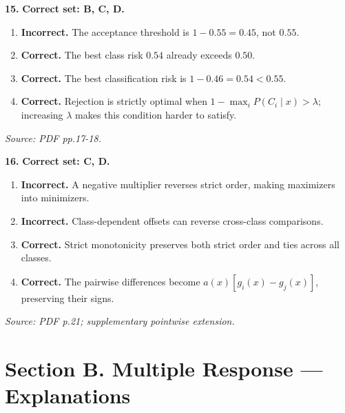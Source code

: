 \documentclass[11pt,a4paper]{article}
\begin{document}
\par\noindent\begin{minipage}{\linewidth}
\textbf{15.} \textbf{Correct set: B, C, D.}
\begin{enumerate}[label=(\Alph*),leftmargin=8mm,itemsep=2pt,topsep=2pt]
\item \textbf{Incorrect.} The acceptance threshold is \(1-0.55=0.45\), not \(0.55\).
\item \textbf{Correct.} The best class risk \(0.54\) already exceeds \(0.50\).
\item \textbf{Correct.} The best classification risk is \(1-0.46=0.54<0.55\).
\item \textbf{Correct.} Rejection is strictly optimal when \(1-\max_iP(C_i\mid x)>\lambda\); increasing \(\lambda\) makes this condition harder to satisfy.
\end{enumerate}
{\footnotesize\textit{Source: PDF pp.17-18.}}

\end{minipage}\par\vspace{3mm}
\par\noindent\begin{minipage}{\linewidth}
\textbf{16.} \textbf{Correct set: C, D.}
\begin{enumerate}[label=(\Alph*),leftmargin=8mm,itemsep=2pt,topsep=2pt]
\item \textbf{Incorrect.} A negative multiplier reverses strict order, making maximizers into minimizers.
\item \textbf{Incorrect.} Class-dependent offsets can reverse cross-class comparisons.
\item \textbf{Correct.} Strict monotonicity preserves both strict order and ties across all classes.
\item \textbf{Correct.} The pairwise differences become \(a(x)[g_i(x)-g_j(x)]\), preserving their signs.
\end{enumerate}
{\footnotesize\textit{Source: PDF p.21; supplementary pointwise extension.}}

\end{minipage}\par\vspace{3mm}
\newpage\section*{Section B. Multiple Response --- Explanations}
\end{document}
